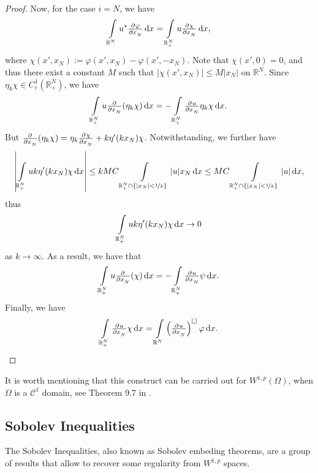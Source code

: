 \documentclass[a4paper,doc,11pt]{article}
\newcommand{\R}{\mathbb{R}}
\newcommand{\CC}{\mathcal{C}}
\begin{document}
\begin{proof}
    
    Now, for the case \( i = N\), we have
    \[
        \int\limits_{\R^N} u^* \pd{\varphi}{x_N} \dif x = 
        \int\limits_{\R^N_+} u \pd{\chi}{x_N} \dif x ,
    \]
    where \(\chi(x', x_N) := \varphi(x', x_N) - \varphi(x', -x_N)\). Note that \( \chi(x',0) = 0\), and thus there exist a constant \(M\) such that \(|\chi(x',x_N)| \leq M|x_N|\) on \(\R^N\). Since \( \eta_k \chi \in C_c^1 (\R^N_+)\), we have
    \[
        \int\limits_{\R^N_+} u \pd{ }{x_N} (\eta_k \chi) \dif x 
        =
        -\int\limits_{\R^N_+} \pd{u}{x_N} \eta_k \chi \dif x.
    \]
    But \( \pd{ }{x_N} (\eta_k \chi) = \eta_k \pd{\chi}{x_N} + k \eta'(k x_N) \chi \). Notwithstanding, we further have
    \[
        \left| \int\limits_{\R^N_+} u k \eta'(k x_N) \chi \dif x \right|
        \leq k M C \int\limits_{\R^N_+ \cap \{|x_N| < \nicefrac 1 k\}} |u| x_N \dif x
        \leq MC \int\limits_{\R^N_+ \cap \{|x_N| < \nicefrac 1 k\}} |u| \dif x,
    \]
    thus
    \[
        \int\limits_{\R^N_+} u k \eta'(k x_N) \chi \dif x \to 0 
    \]
    as \(k \to \infty\). As a result, we have that
    \[
        \int\limits_{\R^N_+} u \pd{ }{x_N} (\chi) \dif x 
        =
        -\int\limits_{\R^N_+} \pd{u}{x_N} \psi \dif x.
    \]
    Finally, we have 
    \[
        \int\limits_{\R^N_+} \pd{u}{x_N} \chi \dif x 
        =
        \int\limits_{\R^N} \left( \pd{u}{x_N} \right)^\square \varphi \dif x.
        \qedhere
    \]
\end{proof}

It is worth mentioning that this construct can be carried out for \(W^{1,p}(\Omega)\), when \(\Omega\) is a \(\CC^1\) domain, see Theorem 9.7 in \citep{Brezis2010}.

\subsection{Sobolev Inequalities}

The Sobolev Inequalities, also known as Sobolev embeding theorems, are a group of results that allow to recover some regularity from \(W^{1,p}\) spaces. 
\end{document}
